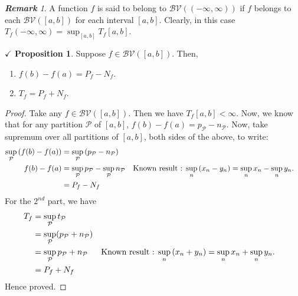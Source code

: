 \documentclass{article}
\theoremstyle{definition}
\theoremstyle{remark}
\newtheorem*{remark}{\textbf{Remark}}
\theoremstyle{definition}
\theoremstyle{definition}
\newtheorem{proposition}{$\checkmark$ Proposition}
\theoremstyle{definition}
\newcommand{\bv}[1]{\mathcal{BV}\left (#1\right )}
\begin{document}
\begin{remark}
	A function $ f $ is said to belong to $ \bv{(-\infty,\infty)} $ if $ f $ belongs to each $ \bv{[a,b]} $ for each interval $ [a,b] $. Clearly, in this case $ T_f(-\infty,\infty)  = \sup_{[a,b]} T_f[a,b]$.
\end{remark}
\hrulefill
\begin{proposition}
	Suppose $ f\in \bv{[a,b]} $. Then,
	\begin{enumerate}
		\item {$ f(b) - f(a) = P_f-N_f$.}
		\item {$ T_f = P_f + N_f $.}
	\end{enumerate}
\end{proposition}
\begin{proof}
	Take any $ f\in \bv{[a,b]} $. Then we have $ T_f[a,b] < \infty$. Now, we know that for any partition $ \mathcal{P} $ of $ [a,b] $, $ f(b) - f(a) = p_\mathcal{P} - n_\mathcal{P} $. Now, take supremum over all partitions of $ [a,b] $, both sides of the above, to write:
	\begin{align*}
		\sup_{\mathcal{P}} \left (f(b) - f(a)\right ) &= \sup_{\mathcal{P}} \left (p_\mathcal{P} - n_\mathcal{P}\right )\\
		f(b) - f(a)&= \sup_{\mathcal{P}} p_\mathcal{P} - \sup_{\mathcal{P}} n_\mathcal{P} &&\text{Known result : $ \sup_n \left (x_n - y_n \right ) = \sup_n x_n - \sup_n y_n $.}\\
		&= P_f - N_f
   	\end{align*}
   For the $ 2^{nd} $ part, we have
   \begin{align*}
   	T_f &= \sup_{\mathcal{P}} t_\mathcal{P}\\
   	&= \sup_{\mathcal{P}} (p_\mathcal{P} + n_{\mathcal{P}})\\
   	&= \sup_{\mathcal{P}} p_{\mathcal{P}} + n_{\mathcal{P}} &&\text{Known result : $ \sup_n \left (x_n + y_n \right ) = \sup_n x_n + \sup_n y_n $.}\\
   	&= P_f + N_f
    \end{align*}
Hence proved.
\end{proof}
\hrulefill
\end{document}
